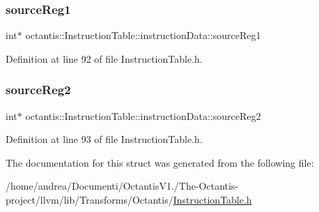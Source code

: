 \subsubsection{\texorpdfstring{source\+Reg1}{sourceReg1}}
{\footnotesize\ttfamily int$\ast$ octantis\+::\+Instruction\+Table\+::instruction\+Data\+::source\+Reg1}



Definition at line 92 of file Instruction\+Table.\+h.

\mbox{\label{structoctantis_1_1InstructionTable_1_1instructionData_a7ad5fad9cd4cf3606b25a000f91c30c0}} 
\subsubsection{\texorpdfstring{source\+Reg2}{sourceReg2}}
{\footnotesize\ttfamily int$\ast$ octantis\+::\+Instruction\+Table\+::instruction\+Data\+::source\+Reg2}



Definition at line 93 of file Instruction\+Table.\+h.



The documentation for this struct was generated from the following file\+:\begin{DoxyCompactItemize}
\item 
/home/andrea/\+Documenti/\+Octantis\+V1./\+The-\/\+Octantis-\/project/llvm/lib/\+Transforms/\+Octantis/\hyperlink{InstructionTable_8h}{Instruction\+Table.\+h}\end{DoxyCompactItemize}
